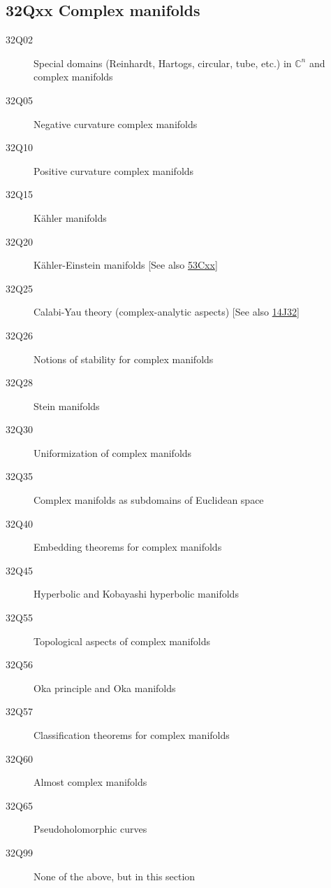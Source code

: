 \documentclass[letterpaper]{article}
\begin{document}
\subsection*{32Qxx  Complex manifolds }\label{32Qxx}
\begin{description} 
\item [32Q02]\label{32Q02} Special domains (Reinhardt, Hartogs, circular, tube, etc.) in $\mathbb{C}^n$ and complex manifolds
\item [32Q05]\label{32Q05} Negative curvature complex manifolds
\item [32Q10]\label{32Q10} Positive curvature complex manifolds
\item [32Q15]\label{32Q15} K\"{a}hler manifolds
\item [32Q20]\label{32Q20} K\"{a}hler-Einstein manifolds [See also \hyperref[53Cxx]{53Cxx}]
\item [32Q25]\label{32Q25} Calabi-Yau theory (complex-analytic aspects) [See also \hyperref[14J32]{14J32}]
\item [32Q26]\label{32Q26} Notions of stability for complex manifolds
\item [32Q28]\label{32Q28} Stein manifolds
\item [32Q30]\label{32Q30} Uniformization of complex manifolds 
\item [32Q35]\label{32Q35} Complex manifolds as subdomains of Euclidean space
\item [32Q40]\label{32Q40} Embedding theorems  for complex manifolds
\item [32Q45]\label{32Q45} Hyperbolic and Kobayashi hyperbolic manifolds
\item [32Q55]\label{32Q55} Topological aspects of complex manifolds
\item [32Q56]\label{32Q56} Oka principle and Oka manifolds
\item [32Q57]\label{32Q57} Classification theorems for complex manifolds
\item [32Q60]\label{32Q60} Almost complex manifolds
\item [32Q65]\label{32Q65} Pseudoholomorphic curves
\item [32Q99]\label{32Q99} None of the above, but in this section
\end{description}
\end{document}
